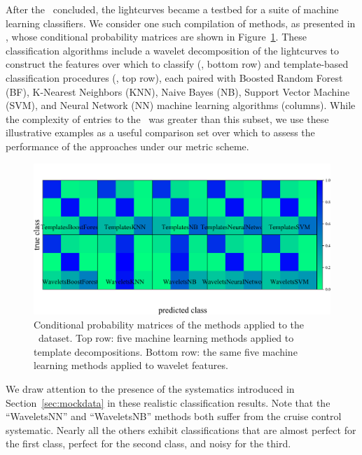 After the \snphotcc\ concluded, the lightcurves became a testbed for a suite of machine learning classifiers.
We consider one such compilation of methods, as presented in \citet{lochner_photometric_2016}, whose conditional probability matrices are shown in Figure~\ref{fig:snphotcc_cm}.
These classification algorithms include a wavelet decomposition of the lightcurves to construct the features over which to classify (\citet{newling_statistical_2011}, bottom row) and template-based classification procedures (\citet{sako_photometric_2011}, top row), each paired with Boosted Random Forest (BF), K-Nearest Neighbors (KNN), Naive Bayes (NB), Support Vector Machine (SVM), and Neural Network (NN) machine learning algorithms (columns).
While the complexity of entries to the \snphotcc\ was greater than this subset, we use these illustrative examples as a useful comparison set over which to assess the performance of the approaches under our metric scheme.

\begin{figure}
	\begin{center}
    \includegraphics[width=\textwidth]{./fig/all_snphotcc_cm.png}
		\caption{Conditional probability matrices of the \citet{lochner_photometric_2016} methods applied to the \snphotcc\ dataset.
    Top row: five machine learning methods applied to template decompositions.
    Bottom row: the same five machine learning methods applied to wavelet features.}
		\label{fig:snphotcc_cm}
	\end{center}
\end{figure}

We draw attention to the presence of the systematics introduced in Section~\ref{sec:mockdata} in these realistic classification results.
Note that the ``WaveletsNN'' and ``WaveletsNB'' methods both suffer from the cruise control systematic.
Nearly all the others exhibit classifications that are almost perfect for the first class, perfect for the second class, and noisy for the third.

